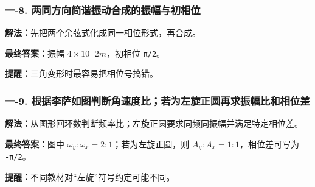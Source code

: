 \documentclass[12pt,a4paper]{ctexart}
\begin{document}
\subsubsection*{一-8. 两同方向简谐振动合成的振幅与初相位}
\begin{tcolorbox}[colback=gray!2!white,colframe=black!60,title={题目}]

\end{tcolorbox}
\begin{tcolorbox}[colback=blue!2!white,colframe=blue!55!black,title={完整答案}]
\textbf{解法：}先把两个余弦式化成同一相位形式，再合成。\par
\textbf{最终答案：}振幅 \(4×10^-2 m\)，初相位 \texttt{π/2}。\par

\end{tcolorbox}
\begin{tcolorbox}[colback=red!2!white,colframe=red!55!black,title={易错点}]
\textbf{提醒：}三角变形时最容易把相位号搞错。\par
\end{tcolorbox}

\subsubsection*{一-9. 根据李萨如图判断角速度比；若为左旋正圆再求振幅比和相位差}
\begin{tcolorbox}[colback=gray!2!white,colframe=black!60,title={题目}]

\end{tcolorbox}
\begin{tcolorbox}[colback=blue!2!white,colframe=blue!55!black,title={完整答案}]
\textbf{解法：}从图形回环数判断频率比；左旋正圆要求同频同振幅并满足特定相位差。\par
\textbf{最终答案：}图中 \(ω_y:ω_x=2:1\)；若为左旋正圆，则 \(A_y:A_x=1:1\)，相位差可写为 \texttt{-π/2}。\par

\end{tcolorbox}
\begin{tcolorbox}[colback=red!2!white,colframe=red!55!black,title={易错点}]
\textbf{提醒：}不同教材对“左旋”符号约定可能不同。\par
\end{tcolorbox}
\end{document}
